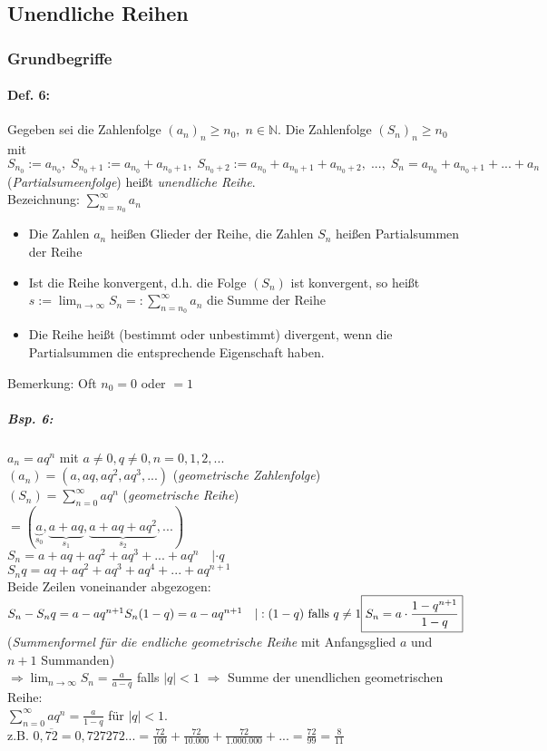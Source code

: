 \subsection{Unendliche Reihen} 
\subsubsection{Grundbegriffe}\label{2.1.3}
\paragraph{Def. 6:} 
Gegeben sei die Zahlenfolge $(a_n)_n \geq n_0, \; n\in \mathbb{N}$. Die Zahlenfolge $(S_n)_n \geq n_0$ mit $S_{n_0}:=a_{n_0}, \; S_{n_0 + 1} := a_{n_0}+a_{n_0 +1}, \; S_{n_0 +2} := a_{n_0} + a_{n_0 +1} + a_{n_0 +2}, \; ..., \; S_n=a_{n_0}+a_{n_0 +1} +...+a_n$ (\emph{Partialsumeenfolge}) heißt \emph{unendliche Reihe}.\\
Bezeichnung: $\boxed{\sum_{n=n_0}^{\infty} a_n}$
\begin{itemize}
\item Die Zahlen $a_n$ heißen Glieder der Reihe, die Zahlen $S_n$ heißen Partialsummen der Reihe
\item Ist die Reihe konvergent, d.h. die Folge $(S_n)$ ist konvergent, so heißt $s:=\lim_{n\to \infty}S_n=: \sum_{n=n_0}^{\infty} a_n$ die Summe der Reihe
\item Die Reihe heißt (bestimmt oder unbestimmt) divergent, wenn die Partialsummen die entsprechende Eigenschaft haben.
\end{itemize}
Bemerkung: Oft $n_0=0$ oder $=1$
\subparagraph{Bsp. 6:} $a_n=a q^n$ mit $a\not = 0, q \not = 0, n=0,1,2,...$\\
$(a_n)=(a, aq, aq^2, aq^3,...)$ (\emph{geometrische Zahlenfolge})\\
$(S_n)=\sum_{n=0}^\infty aq^n$ (\emph{geometrische Reihe})\\
$= (\underbrace{a}_{s_0}, \underbrace{a+aq}_{s_1}, \underbrace{a+ aq+ aq^2}_{s_2}, ...)$\\
$S_n=a + aq + aq^2 + aq^3+...+aq^n \quad | \cdot q$\\
$S_nq=aq+aq^2+aq^3+aq^4+...+aq^{n+1}$\\
Beide Zeilen voneinander abgezogen:\\
$S_n-S_nq = a - aq^{n+1}\\
S_n(1-q) = a - aq^{n+1} \quad | : (1-q) \text{ falls }q\not = 1\\
\boxed{S_n = a\cdot \frac{1-q^{n+1}}{1-q}}$ (\emph{Summenformel für die endliche geometrische Reihe} mit Anfangsglied $a$ und $n+1$ Summanden)\\
$\Rightarrow \lim_{n\to \infty}S_n=\frac{a}{a-q}$ falls $|q|<1$
$\Rightarrow$ Summe der unendlichen geometrischen Reihe:\\
$\boxed{\sum_{n=0}^\infty a q^n=\frac{a}{1-q}}$ für $|q|<1$.\\
z.B. $0,\overline{72}=0,727272...=\frac{72}{100}+\frac{72}{10.000}+\frac{72}{1.000.000}+...=\frac{72}{99}=\frac{8}{11}$

